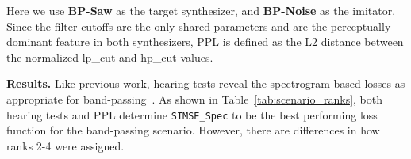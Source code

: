 \documentclass[10pt]{article} %
\newcommand{\SIMSESpec}{\texttt{SIMSE\_\allowbreak Spec}\xspace}
\newcommand{\BPNoise}{\textbf{BP-Noise}\xspace}
\newcommand{\BPSaw}{\textbf{BP-Saw}\xspace}
\begin{document}
 
 Here we use \BPSaw as the target synthesizer, and \BPNoise as the imitator. Since the filter cutoffs are the only shared parameters and are the perceptually dominant feature in both synthesizers, PPL is defined as the L2 distance between the normalized lp\_cut and hp\_cut values.

\noindent \textbf{Results.} Like previous work, hearing tests reveal the spectrogram based losses as appropriate for band-passing~\cite{salimi2025evaluating}. As shown in Table~\ref{tab:scenario_ranks}, both hearing tests and PPL determine \SIMSESpec to be the best performing loss function for the band-passing scenario. However, there are differences in how ranks 2-4 were assigned. 
 
\begin{table}[t]
\centering
\small
\setlength{\tabcolsep}{4pt}
\renewcommand{\arraystretch}{1.15}
\caption{Summary of ranks across seven scenarios using two evaluation measures: bootstrapped PPL and bootstrapped hearing survey ratings. Lower rank indicates better performance.}
\label{tab:scenario_ranks}
\end{table}
\end{document}

